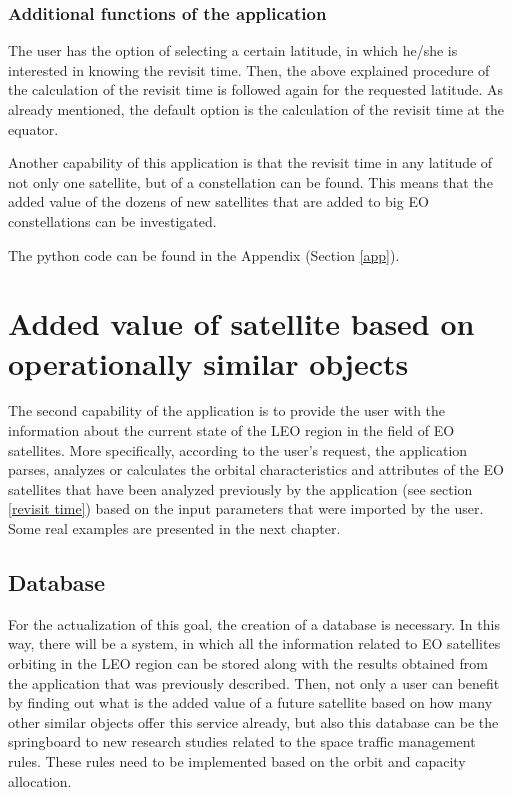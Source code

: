\bigskip
\subsubsection{Additional functions of the application}
\bigskip
The user has the option of selecting a certain latitude, in which he/she is interested in knowing the revisit time. Then, the above explained procedure of the calculation of the revisit time is followed again for the requested latitude. As already mentioned, the default option is the calculation of the revisit time at the equator.

Another capability of this application is that the revisit time in any latitude of not only one satellite, but of a constellation can be found. This means that the added value of the dozens of new satellites that are added to big EO constellations can be investigated.

\bigskip
The python code can be found in the Appendix (Section \ref{app}).

\bigskip
\section{Added value of satellite based on operationally similar objects}
\label{added value}
\bigskip

The second capability of the application is to provide the user with the information about the current state of the LEO region in the field of EO satellites. More specifically, according to the user's request, the application parses, analyzes or calculates the orbital characteristics and attributes of the EO satellites that have been analyzed previously by the application (see section \ref{revisit time}) based on the input parameters that were imported by the user. Some real examples are presented in the next chapter.

\bigskip
\subsection{Database}
\label{database_ch3}
\bigskip

For the actualization of this goal, the creation of a database is necessary. In this way, there will be a system, in which all the information related to EO satellites orbiting in the LEO region can be stored along with the results obtained from the application that was previously described. Then, not only a user can benefit by finding out what is the added value of a future satellite based on how many other similar objects offer this service already, but also this database can be the springboard to new research studies related to the space traffic management rules. These rules need to be implemented based on the orbit and capacity allocation.

